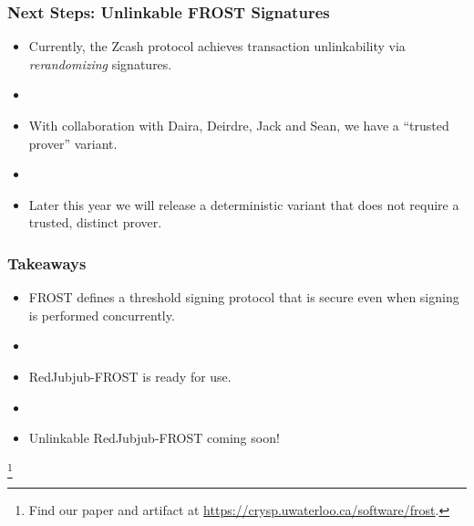 \documentclass[hyperref={pdfpagelabels=true},table,dvipsnames,14pt,aspectratio=169]{beamer}
\begin{document}
\begin{frame}
  \frametitle{Next Steps: Unlinkable FROST Signatures}

  \begin{itemize}
    \item<1-> Currently, the Zcash protocol achieves transaction unlinkability via \emph{rerandomizing} signatures.
    \item[]
    \item<2-> With collaboration with Daira, Deirdre, Jack and Sean, we have a ``trusted prover'' variant.
    \item[]
    \item<3-> Later this year we will release a deterministic variant that does not require a trusted, distinct prover.
  \end{itemize}
\end{frame}

\begin{frame}
  \frametitle{Takeaways}
  \begin{itemize}
    \item<1-> FROST defines a threshold signing protocol that is
      secure even when signing is performed concurrently.
    \item[]
    \item<2-> RedJubjub-FROST is ready for use.
    \item[]
    \item<3-> Unlinkable RedJubjub-FROST coming soon!
  \end{itemize}
      \let\thefootnote\relax\footnote{
      Find our paper and artifact at
      \url{https://crysp.uwaterloo.ca/software/frost}.
      }
\end{frame}

\begin{comment}
\begin{frame}
  \huge
  \centering
  EXTRAS
\end{frame}
\end{comment}
\end{document}

